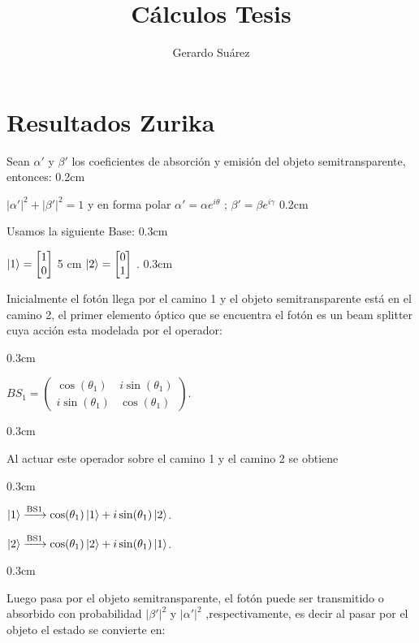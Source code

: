 \documentclass[11pt]{article}
\title
{\textbf
{Cálculos Tesis}}
\author
{Gerardo Suárez
}
\date{}
\begin{document}
\maketitle


\section
{Resultados Zurika
}

Sean $\alpha
'$ y $\beta'$ los coeficientes de absorción y emisión del objeto semitransparente, entonces:
\vspace
{0.2cm}

$|
\alpha
'|^2 + |\beta'|^2 = 1$  
y en forma polar   
$\alpha
'=\alpha
 e^
{i \theta}$ ; $\beta'=\beta e^
{i \gamma}$
\vspace
{0.2cm}

Usamos la siguiente Base:
\vspace
{0.3cm}


$\ket
{1}=\begin
{bmatrix} 1 \\0\end{bmatrix} $   
\hspace
{5 cm}   
$\ket
{2}=\begin
{bmatrix} 0\\1\end
{bmatrix}$ .
\vspace
{0.3cm}

Inicialmente el fotón llega por el camino 1 y el objeto semitransparente está en el camino 2, el primer elemento óptico que se encuentra el fotón es un beam splitter
 cuya acción esta modelada por el operador:

\vspace
{0.3cm}

$BS_
{1}=\begin
{pmatrix} \cos(\theta_
{1}) & i \sin(\theta_
{1}) \\ i \sin(\theta_
{1}) & \cos
(\theta_
{1}) \end
{pmatrix}$.

\vspace
{0.3cm}

Al actuar este operador sobre el camino 1 y el camino 2 se obtiene 

\vspace
{0.3cm}

$\ket{1}\xrightarrow{\text{BS1}}\cos(\theta_{1})\ket{1}+i\sin(\theta_{1})\ket{2}$.

$\ket
{2}\xrightarrow{\text{BS1}}\cos
(\theta_
{1})\ket
{2}+i\sin(\theta_
{1})\ket
{1}$.

\vspace
{0.3cm}

Luego pasa por el objeto semitransparente, el fotón puede ser transmitido o absorbido con probabilidad $|
\beta'|^2$ y $|
\alpha
'|^2$ ,respectivamente, es decir al pasar por el objeto el estado se convierte en:
\end{document}
